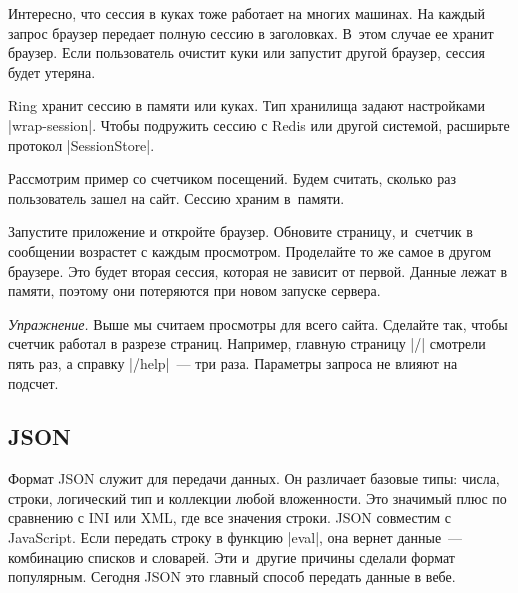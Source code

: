 Интересно, что сессия в куках тоже работает на многих машинах. На каждый запрос
браузер передает полную сессию в заголовках. В~этом случае ее хранит
браузер. Если пользователь очистит куки или запустит другой браузер, сессия
будет утеряна.

Ring хранит сессию в памяти или куках. Тип хранилища задают настройками
\spverb|wrap-session|. Чтобы подружить сессию с Redis или другой системой,
расширьте протокол \spverb|SessionStore|.

Рассмотрим пример со счетчиком посещений. Будем считать, сколько раз
пользователь зашел на сайт. Сессию храним в~памяти.

\begin{english}
\end{english}

Запустите приложение и откройте браузер. Обновите страницу, и~счетчик в
сообщении возрастет с каждым просмотром. Проделайте то же самое в другом
браузере. Это будет вторая сессия, которая не зависит от первой. Данные лежат в
памяти, поэтому они потеряются при новом запуске сервера.

\emph{Упражнение.} Выше мы считаем просмотры для всего сайта. Сделайте так,
чтобы счетчик работал в разрезе страниц. Например, главную страницу \spverb|/|
смотрели пять раз, а справку \spverb|/help|~--- три раза. Параметры запроса не
влияют на подсчет.

\subsection{JSON}

Формат JSON служит для передачи данных. Он различает базовые типы: числа,
строки, логический тип и коллекции любой вложенности. Это значимый плюс по
сравнению с INI или XML, где все значения строки. JSON совместим с
JavaScript. Если передать строку в функцию \spverb|eval|, она вернет данные~---
комбинацию списков и словарей. Эти и~другие причины сделали формат
популярным. Сегодня JSON это главный способ передать данные в вебе.

